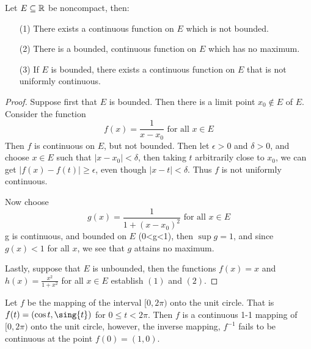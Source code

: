 \begin{theorem}\label{5.3.7}
    Let $E \subseteq \mathbb{R}$ be noncompact, then:
        \begin{enumerate}
            \item[(1)] There exists a continuous function on $E$ which is not bounded.

            \item[(2)] There is a bounded, continuous function on $E$ which has no maximum.

            \item[(3)] If  $E$ is bounded, there exists a continuous function on  $E$ that is
                not uniformly continuous.
        \end{enumerate}
\end{theorem}
\begin{proof}
    Suppose first that $E$ is bounded. Then there is a limit point  $x_0 \notin E$ of $E$.
    Consider the function
        \begin{equation*}
            f(x)=\frac{1}{x-x_0} \text{ for all } x \in E
        \end{equation*}
    Then $f$ is continuous on  $E$, but not bounded. Then let  $\epsilon>0$ and  $\delta>0$, and
    choose  $x \in E$ such that  $|x-x_0|<\delta$, then taking $t$ arbitrarily close to  $x_0$,
    we can get $|f(x)-f(t)| \geq \epsilon$, even though  $|x-t|<\delta$. Thus  $f$ is not
    uniformly continuous.

    Now choose
        \begin{equation*}
            g(x)=\frac{1}{1+(x-x_0)^2} \text{ for all } x \in E
        \end{equation*}
    g is continuous, and bounded on $E$ (0<g<1), then $\sup{g}=1$, and since  $g(x)<1$ for all
    $x$, we see that  $g$ attains no maximum.

    Lastly, suppose that $E$ is unbounded, then the functions  $f(x)=x$ and  $h(x)=\frac{x^2}{1+x^2}$
    for all $x \in E$ establish  $(1)$ and  $(2)$.
\end{proof}

\begin{example}
    Let $f$ be the mapping of the interval  $[0,2\pi)$ onto the unit circle. That is
    $f(t)=(\cos{t},\sing{t})$ for  $0 \leq t<2\pi$. Then  $f$ is a continuous 1-1 mapping of
    $[0,2\pi)$ onto the unit circle, however, the inverse mapping,  $f^{-1}$ fails to be
    continuous at  the point $f(0)=(1,0)$.
\end{example}
